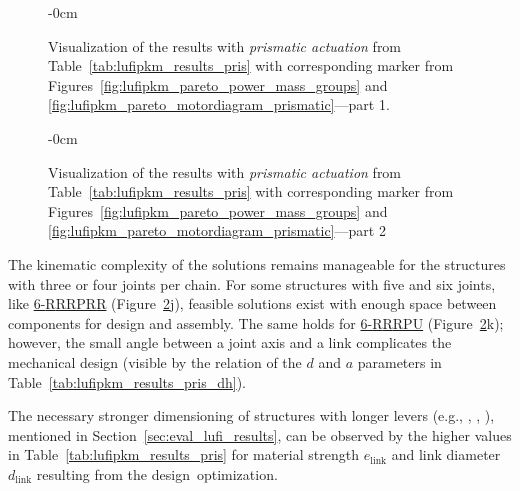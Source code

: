 \begin{figure}[H]
  \begin{adjustwidth}{-\extralength}{0cm}
    \centering
    \graphicspath{{Figures/}}
    
  \end{adjustwidth}
  \vspace{-9pt}
  \caption{Visualization %
    of the results with \emph{prismatic actuation} from Table~\ref{tab:lufipkm_results_pris} with corresponding marker from Figures~\ref{fig:lufipkm_pareto_power_mass_groups} and \ref{fig:lufipkm_pareto_motordiagram_prismatic}---part 1.}
  \label{fig:lufipkm_robots2}
\end{figure}


\begin{figure}[H] %
  \begin{adjustwidth}{-\extralength}{0cm}
    \centering
    \graphicspath{{Figures/}}
    
  \end{adjustwidth}
  \caption[Naval-testbed task: Visualization of the results with prismatic actuation (part~2)]{Visualization of the results with \emph{prismatic actuation} from Table~\ref{tab:lufipkm_results_pris} with corresponding marker from Figures~\ref{fig:lufipkm_pareto_power_mass_groups} and \ref{fig:lufipkm_pareto_motordiagram_prismatic}---part 2}
  \label{fig:lufipkm_robots3}
\end{figure}

The kinematic complexity of the solutions remains manageable for the structures with three or four joints per chain.
For some structures with five and six joints, like \hyperref[restabrow:P6RRRPRR9V10GxPxA4]{6-{R}{R}{R}\underline{P}{R}{R}} (Figure~\ref{fig:lufipkm_robots3}j), feasible solutions exist with enough space between components for design and assembly.
The same holds for \hyperref[restabrow:P6RRRPRR9V6GxPxA4]{6-{R}{R}{R}\underline{P}{U}} (Figure~\ref{fig:lufipkm_robots3}k); however, the small angle between a joint axis and a link complicates the mechanical design (visible by the relation of the $d$ and $a$ parameters in Table~\ref{tab:lufipkm_results_pris_dh}).

\newpage
The necessary stronger dimensioning of structures with longer levers (e.g., , , ), mentioned in Section~\ref{sec:eval_lufi_results}, can be observed by the higher values in Table~\ref{tab:lufipkm_results_pris} for material strength {$e_\mathrm{link}$} and link diameter $d_\mathrm{link}$ resulting from the \mbox{design~optimization}.


